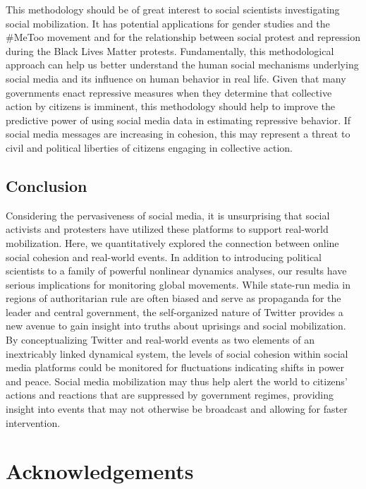 \documentclass[english,man]{apa6}
\begin{document}
This methodology should be of great interest to social scientists investigating
social mobilization. It has potential applications for gender studies and
the \#MeToo movement and for the relationship between social protest and repression
during the Black Lives Matter protests. Fundamentally, this methodological
approach can help us better understand the human social mechanisms underlying
social media and its influence on human behavior in real life. Given that many
governments enact repressive measures when they determine that collective action
by citizens is imminent, this methodology should help to improve the predictive
power of using social media data in estimating repressive behavior. If social
media messages are increasing in cohesion, this may represent a threat to civil
and political liberties of citizens engaging in collective action.

\hypertarget{conclusion}{%
\subsection{Conclusion}\label{conclusion}}

Considering the pervasiveness of social media, it is unsurprising that social
activists and protesters have utilized these platforms to support real-world
mobilization. Here, we quantitatively explored the connection between online
social cohesion and real-world events. In addition to introducing political
scientists to a family of powerful nonlinear dynamics analyses, our results have
serious implications for monitoring global movements. While state-run media in
regions of authoritarian rule are often biased and serve as propaganda for the
leader and central government, the self-organized nature of Twitter provides a
new avenue to gain insight into truths about uprisings and social mobilization.
By conceptualizing Twitter and real-world events as two elements of an
inextricably linked dynamical system, the levels of social cohesion within
social media platforms could be monitored for fluctuations indicating shifts in
power and peace. Social media mobilization may thus help alert the world to
citizens' actions and reactions that are suppressed by government regimes,
providing insight into events that may not otherwise be broadcast and allowing
for faster intervention.

\hypertarget{acknowledgements}{%
\section{Acknowledgements}\label{acknowledgements}}
\end{document}
